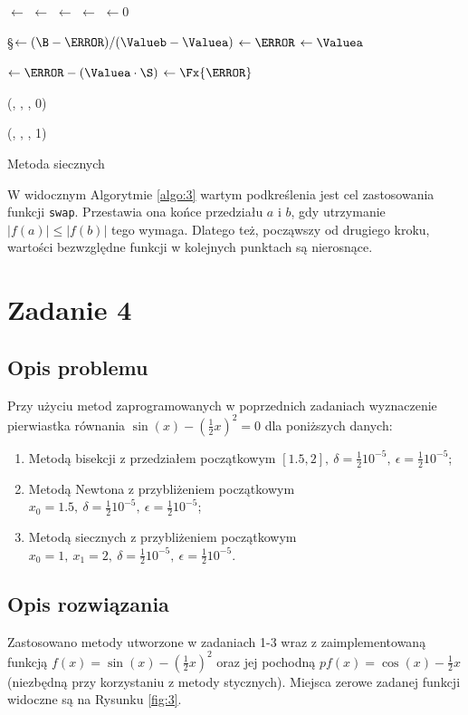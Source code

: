 \documentclass{classrep}
\begin{document}
\begin{algorithm}[!htbp]
    			\F{\Mb{\Fx, \XX, \XY, \Delta, \Eps, \Maxit}} {		    
		    
		    	\A $\leftarrow$ \XX\;
		    	\B $\leftarrow$ \XY\;
		    	\Valuea $\leftarrow$ \Fx{\A}\;
		    	\Valueb $\leftarrow$ \Fx{\B}\;
		    	\It $\leftarrow 0$\;
		    	
		    	 {
		    		\If{$|\Valuea| > |\Valueb|$} {
		    			\Swap{\A, \B}\;
		    			\Swap{\Valuea, \Valueb}\;
		    		}
		    		\S $\leftarrow (\B - \A) / (\Valueb - \Valuea)$\;
		    		\B $\leftarrow \A$\;
		    		\Valueb $\leftarrow \Valuea$\;
		    		
		    		\A $\leftarrow \A - (\Valuea \cdot \S)$\;
		    		\Valuea $\leftarrow \Fx{\A}$\;		    		
		    		
    				\If{$|\Valuea| < \Eps \lor |\B - \A| < \Delta$} {
    					\KwRet (\A, \Valuea, \It, 0)\;
    				}
    			}
    			\KwRet (\A, \Valuea, \It, 1)\;
    			}
    			\caption{Metoda siecznych}
    			\label{algo:3}
		\end{algorithm}	
			
		W widocznym Algorytmie \ref{algo:3} wartym podkreślenia jest cel zastosowania funkcji \texttt{swap}. Przestawia ona końce przedziału $a$ i $b$, gdy utrzymanie $|f(a)| \leq |f(b)|$ tego wymaga. Dlatego też, począwszy od drugiego kroku, wartości bezwzględne funkcji w kolejnych punktach są nierosnące.
\section{Zadanie 4}
	\subsection{Opis problemu}
		Przy użyciu metod zaprogramowanych w poprzednich zadaniach wyznaczenie pierwiastka równania $\sin(x)-(\frac{1}{2}x)^2=0$ dla poniższych danych:
		\begin{enumerate}[1.]
			\item Metodą bisekcji z przedziałem początkowym $[1.5,2],~\delta=\frac{1}{2}10^{-5},~\epsilon=\frac{1}{2}10^{-5}$;
			\item Metodą Newtona z przybliżeniem początkowym $x_0=1.5,~\delta=\frac{1}{2}10^{-5},~\epsilon=\frac{1}{2}10^{-5}$;
			\item Metodą siecznych z przybliżeniem początkowym $x_0=1,~x_1=2,~\delta=\frac{1}{2}10^{-5},~\epsilon=\frac{1}{2}10^{-5}$.
		\end{enumerate}
		
	\subsection{Opis rozwiązania}
		Zastosowano metody utworzone w zadaniach 1-3 wraz z zaimplementowaną funkcją $f(x)=\sin(x)-(\frac{1}{2}x)^2$ oraz jej pochodną $pf(x)=\cos(x)-\frac{1}{2}x$ (niezbędną przy korzystaniu z metody stycznych).  Miejsca zerowe zadanej funkcji widoczne są na Rysunku \ref{fig:3}.
		
\end{document}
